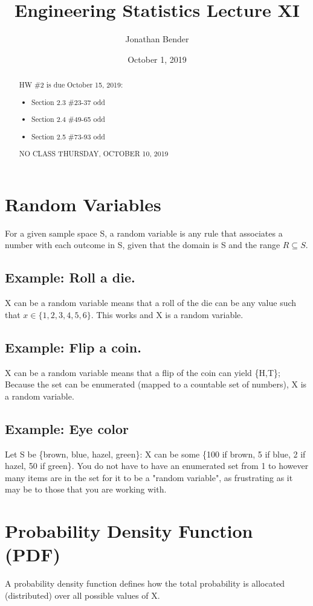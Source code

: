 \documentclass[]{article}
\title{Engineering Statistics Lecture XI}
\author{Jonathan Bender}
\date{October 1, 2019}
\begin{document}
	
	\maketitle
	
	\begin{abstract}	
		HW \#2 is due October 15, 2019:
		\begin{itemize}
			\item Section 2.3 \#23-37 odd
			\item Section 2.4 \#49-65 odd
			\item Section 2.5 \#73-93 odd
		\end{itemize}
	
		NO CLASS THURSDAY, OCTOBER 10, 2019
	\end{abstract}

	\section{Random Variables}
		For a given sample space S, a random variable is any rule that associates a number with each outcome in S, given that the domain is S and the range $R \subseteq S$.
	
		\subsection{Example: Roll a die.}
			X can be a random variable means that a roll of the die can be any value such that $x\in\{1, 2, 3, 4, 5, 6\}$. This works and X is a random variable.
	
		\subsection{Example: Flip a coin.}
			X can be a random variable means that a flip of the coin can yield \{H,T\}; Because the set can be enumerated (mapped to a countable set of numbers), X is a random variable.
	
		\subsection{Example: Eye color}
			Let S be \{brown, blue, hazel, green\}: X can be some \{100 if brown, 5 if blue, 2 if hazel, 50 if green\}. You do not have to have an enumerated set from 1 to however many items are in the set for it to be a "random variable", as frustrating as it may be to those that you are working with.
	
	\section{Probability Density Function (PDF)}
		A probability density function defines how the total probability is allocated (distributed) over all possible values of X.
		
\end{document}
